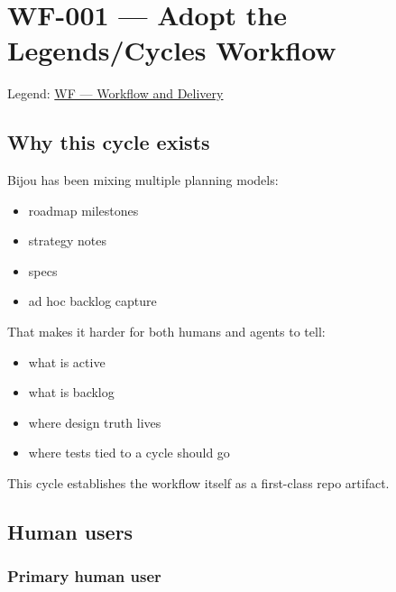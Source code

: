 \chapter{WF-001 --- Adopt the Legends/Cycles Workflow}\label{record-200}

\smallskip

Legend: \href{https://github.com/flyingrobots/bijou/blob/1853ad902f6bf219326409e7f743a5a1d6517dbc/docs/legends/WF-workflow-and-delivery.md}{WF --- Workflow and Delivery}

\section{Why this cycle exists}\label{record-200-why-this-cycle-exists}

Bijou has been mixing multiple planning models:

\begin{itemize}
\tightlist
\item
  roadmap milestones
\item
  strategy notes
\item
  specs
\item
  ad hoc backlog capture
\end{itemize}

That makes it harder for both humans and agents to tell:

\begin{itemize}
\tightlist
\item
  what is active
\item
  what is backlog
\item
  where design truth lives
\item
  where tests tied to a cycle should go
\end{itemize}

This cycle establishes the workflow itself as a first-class repo artifact.

\section{Human users}\label{record-200-human-users}

\subsection{Primary human user}\label{record-200-primary-human-user}


